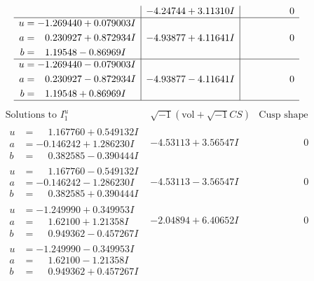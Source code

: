 \documentclass[1p]{elsarticle_modified}
\theoremstyle{definition}
\newcommand{\I}{\sqrt{-1}}
\begin{document}
$$\begin{array}{c|c|c}
 & -4.24744 + 3.11310 I & \phantom{-0.000000 } 0 \\ \hline\begin{aligned}
u &= -1.269440 + 0.079003 I \\
a &= \phantom{-}0.230927 + 0.872934 I \\
b &= \phantom{-}1.19548 - 0.86969 I\end{aligned}
 & -4.93877 + 4.11641 I & \phantom{-0.000000 } 0 \\ \hline\begin{aligned}
u &= -1.269440 - 0.079003 I \\
a &= \phantom{-}0.230927 - 0.872934 I \\
b &= \phantom{-}1.19548 + 0.86969 I\end{aligned}
 & -4.93877 - 4.11641 I & \phantom{-0.000000 } 0\\
 \hline 
 \end{array}$$\newpage$$\begin{array}{c|c|c}  
\text{Solutions to }I^u_{1}& \I (\text{vol} + \sqrt{-1}CS) & \text{Cusp shape}\\
 \hline 
\begin{aligned}
u &= \phantom{-}1.167760 + 0.549132 I \\
a &= -0.146242 + 1.286230 I \\
b &= \phantom{-}0.382585 - 0.390444 I\end{aligned}
 & -4.53113 + 3.56547 I & \phantom{-0.000000 } 0 \\ \hline\begin{aligned}
u &= \phantom{-}1.167760 - 0.549132 I \\
a &= -0.146242 - 1.286230 I \\
b &= \phantom{-}0.382585 + 0.390444 I\end{aligned}
 & -4.53113 - 3.56547 I & \phantom{-0.000000 } 0 \\ \hline\begin{aligned}
u &= -1.249990 + 0.349953 I \\
a &= \phantom{-}1.62100 + 1.21358 I \\
b &= \phantom{-}0.949362 - 0.457267 I\end{aligned}
 & -2.04894 + 6.40652 I & \phantom{-0.000000 } 0 \\ \hline\begin{aligned}
u &= -1.249990 - 0.349953 I \\
a &= \phantom{-}1.62100 - 1.21358 I \\
b &= \phantom{-}0.949362 + 0.457267 I\end{aligned}

\end{array}$$
\end{document}
